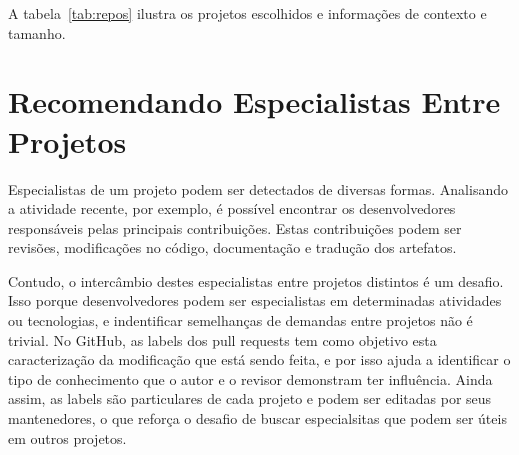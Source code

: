 \documentclass[sigconf]{acmart}
\begin{document}
A tabela~\ref{tab:repos} ilustra os projetos escolhidos e informações de contexto e tamanho.

\begin{table}[!h]

\centering
{}
\caption{Descrição dos Respositórios Selecionados}
\label{tab:repos}
\end{table}

\section{Recomendando Especialistas Entre Projetos}

Especialistas de um projeto podem ser detectados de diversas formas. Analisando a atividade recente, por exemplo, é possível encontrar os desenvolvedores responsáveis pelas principais contribuições. Estas contribuições podem ser revisões, modificações no código, documentação e tradução dos artefatos.

Contudo, o intercâmbio destes especialistas entre projetos distintos é um desafio. Isso porque desenvolvedores podem ser especialistas em determinadas atividades ou tecnologias, e indentificar semelhanças de demandas entre projetos não é trivial. No GitHub, as labels dos pull requests tem como objetivo esta caracterização da modificação que está sendo feita, e por isso ajuda a identificar o tipo de conhecimento que o autor e o revisor demonstram ter influência. Ainda assim, as labels são particulares de cada projeto e podem ser editadas por seus mantenedores, o que reforça o desafio de buscar especialsitas que podem ser úteis em outros projetos.
\end{document}
